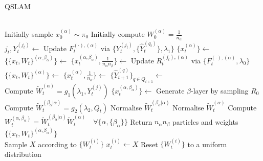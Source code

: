 \begin{algorithm}[H] %
	\caption{QSLAM}\label{algorithm:q-slam-pf}
	\begin{algorithmic}[0] 
		\\
		\State Initially sample $x_{0}^{(\alpha)} \sim \pi_0$ 
		\State Initially compute $W_0^{(\alpha)} = \frac{1}{n_\alpha}$
		\EndFor
		\EndProcedure 
		\EndIf
		\\
		\State $j_t, Y_t^{(j_t)} \gets$ 
		\EndIf
		\State Update $F_t^{(\cdot), (\alpha)}$ via $ \{Y_t^{(j_t)},  \{\hat{Y}_t^{(q_t)}\}, \lambda_1\} $
		\State $\{x_{t}^{(\alpha)}\} \gets $ 
		\State $\{\{x_t, W_t\}^{(\alpha, \beta_\alpha)}\} \gets $ 
		\State $\{x_t^{(\alpha, \beta_\alpha)}, \frac{1}{n_\alpha n_\beta}\} \gets $ 
		\State Update $R_t^{(j_t), (\alpha)}$ via $\{F_t^{(\cdot), (\alpha)}, \lambda_0\} $
		\State $\{\{x_t, W_t\}^{(\alpha)}\} \gets$ 
		\State $\{x_t^{(\alpha)}, \frac{1}{n_\alpha}\} \gets $ 
		\EndFor
		\State $\{\hat{Y}_{t+1}^{(q)}\}_{q\in Q_{t+1}} \gets $ 
		\EndWhile \label{pseudoalgo:qslamr:endwhile2}			
		\EndProcedure
		\\ \dotfill
		\State Compute $\tilde{W}_t^{( \alpha )} = g_1(\lambda_1, Y_t^{(j)}) $ 
		\State $\{x_t^{(\alpha, \beta_\alpha)}\} \gets $  Generate $\beta$-layer by sampling $R_0$ 
		\State Compute $\tilde{W}_t^{( \beta_\alpha | \alpha)} = g_2(\lambda_2, Q_t) $
		\EndFor
		\State Normalise $\tilde{W}_t^{( \beta_\alpha | \alpha)}$
		\EndFor
		\State Normalise $\tilde{W}_t^{( \alpha)}$
		\State Compute $W_t^{(\alpha, \beta_\alpha)} =  \tilde{W}_t^{( \beta_\alpha | \alpha)} \tilde{W}_t^{( \alpha)} \quad \forall \{\alpha, \{\beta_\alpha\} \}$
		\State Return $ n_\alpha n_\beta $ particles and weights $\{\{x_t, W_t\}^{(\alpha, \beta_\alpha)}\}$		
		\EndFunction 
		\\ \dotfill
		\State Sample $X$  according to $\{W_t^{(i)}\}$
		\State $x_t^{(i)} \gets X$
		\EndFor
		\State Reset $\{W_t^{(i)}\}$ to a uniform distribution
		\EndFunction 
	\end{algorithmic}	
\end{algorithm}
